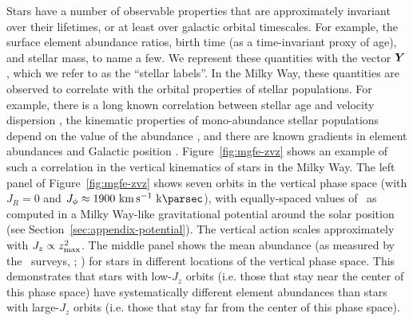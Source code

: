 Stars have a number of observable properties that are approximately invariant over their
lifetimes, or at least over galactic orbital timescales.
For example, the surface element abundance ratios, birth time (as a time-invariant proxy
of age), and stellar mass, to name a few.
We represent these quantities with the vector $\boldsymbol{Y}$, which we refer to as the
``stellar labels''.
In the Milky Way, these quantities are observed to correlate with the orbital
properties of stellar populations.
For example, there is a long known correlation between stellar age and velocity
dispersion \citep{Spitzer:1951, Sharma:2021}, the kinematic properties of mono-abundance
stellar populations depend on the value of the abundance \citep{Bovy:2016, Yu:2021,
Lian:2022}, and there are known gradients in element abundances and Galactic position
\citep[e.g.,][]{Shaver:1983, Maciel:1999, Eilers:2022, Lian:2023}.
Figure~\ref{fig:mgfe-zvz} shows an example of such a correlation in the vertical
kinematics of stars in the Milky Way.
The left panel of Figure~\ref{fig:mgfe-zvz} shows seven orbits in the vertical phase
space (with $J_R=0$ and $J_\phi \approx 1900~\kms~\kpc$), with equally-spaced values of
\zmax\ as computed in a Milky Way-like gravitational potential around the solar position
(see Section~\ref{sec:appendix-potential}).
The vertical action scales approximately with $J_z \propto z_{\textrm{max}}^2$.
The middle panel shows the mean  abundance (as measured by the \apogee\
surveys, ; \citealt{APOGEE:2017, APOGEE:DR17}) for stars in different locations
of the vertical phase space.
This demonstrates that stars with low-$J_z$ orbits (i.e. those that stay near the center
of this phase space) have systematically different element abundances than stars with
large-$J_z$ orbits (i.e. those that stay far from the center of this phase space).



